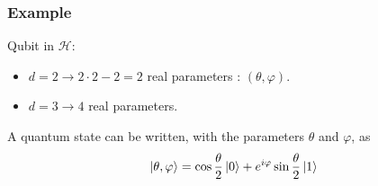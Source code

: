 \documentclass{article}
\begin{document}
\subsubsection*{Example}
Qubit in $\mathscr{H}$:
\begin{itemize}[label=-]
    \item $d=2 \rightarrow 2\cdot2-2 = 2$ real parameters : $(\theta, \varphi)$.
    \item $d=3 \rightarrow 4$ real parameters.
\end{itemize}
A quantum state can be written, with the parameters $\theta$ and $\varphi$, as
\begin{equation}
    \ket{\theta, \varphi} = \cos \frac{\theta}{2}\ket{0} + e^{i\varphi}\sin \frac{\theta}{2}\ket{1}
\end{equation}
\end{document}
